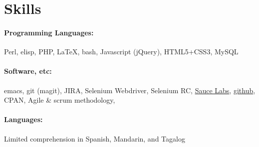 \section{Skills}
%
\paragraph{Programming Languages:} Perl, elisp, PHP, \LaTeX, bash, Javascript (jQuery), HTML5+CSS3, MySQL
\paragraph{Software, etc:} emacs, git (magit), JIRA, Selenium Webdriver, Selenium RC, \href{http://www.saucelabs.com}{Sauce Labs}, \href{http://www.github.com/gempesaw}{github}, CPAN, Agile \& scrum methodology,
\paragraph{Languages:} Limited comprehension in Spanish, Mandarin, and Tagalog

